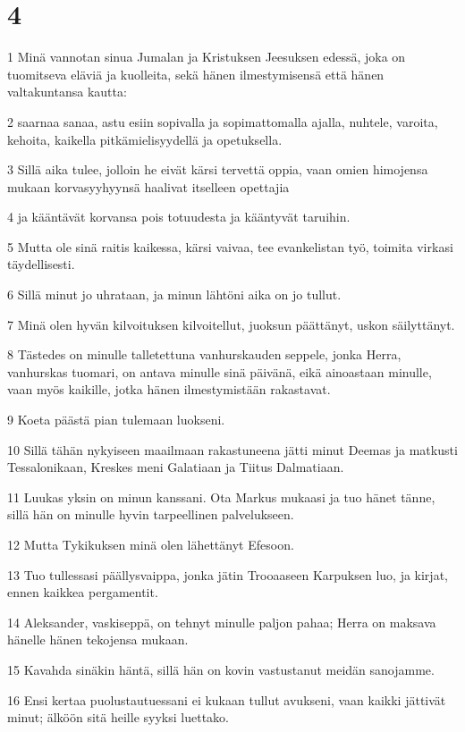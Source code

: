 \chapter{4}

\par 1 Minä vannotan sinua Jumalan ja Kristuksen Jeesuksen edessä, joka on tuomitseva eläviä ja kuolleita, sekä hänen ilmestymisensä että hänen valtakuntansa kautta:
\par 2 saarnaa sanaa, astu esiin sopivalla ja sopimattomalla ajalla, nuhtele, varoita, kehoita, kaikella pitkämielisyydellä ja opetuksella.
\par 3 Sillä aika tulee, jolloin he eivät kärsi tervettä oppia, vaan omien himojensa mukaan korvasyyhyynsä haalivat itselleen opettajia
\par 4 ja kääntävät korvansa pois totuudesta ja kääntyvät taruihin.
\par 5 Mutta ole sinä raitis kaikessa, kärsi vaivaa, tee evankelistan työ, toimita virkasi täydellisesti.
\par 6 Sillä minut jo uhrataan, ja minun lähtöni aika on jo tullut.
\par 7 Minä olen hyvän kilvoituksen kilvoitellut, juoksun päättänyt, uskon säilyttänyt.
\par 8 Tästedes on minulle talletettuna vanhurskauden seppele, jonka Herra, vanhurskas tuomari, on antava minulle sinä päivänä, eikä ainoastaan minulle, vaan myös kaikille, jotka hänen ilmestymistään rakastavat.
\par 9 Koeta päästä pian tulemaan luokseni.
\par 10 Sillä tähän nykyiseen maailmaan rakastuneena jätti minut Deemas ja matkusti Tessalonikaan, Kreskes meni Galatiaan ja Tiitus Dalmatiaan.
\par 11 Luukas yksin on minun kanssani. Ota Markus mukaasi ja tuo hänet tänne, sillä hän on minulle hyvin tarpeellinen palvelukseen.
\par 12 Mutta Tykikuksen minä olen lähettänyt Efesoon.
\par 13 Tuo tullessasi päällysvaippa, jonka jätin Trooaaseen Karpuksen luo, ja kirjat, ennen kaikkea pergamentit.
\par 14 Aleksander, vaskiseppä, on tehnyt minulle paljon pahaa; Herra on maksava hänelle hänen tekojensa mukaan.
\par 15 Kavahda sinäkin häntä, sillä hän on kovin vastustanut meidän sanojamme.
\par 16 Ensi kertaa puolustautuessani ei kukaan tullut avukseni, vaan kaikki jättivät minut; älköön sitä heille syyksi luettako.
